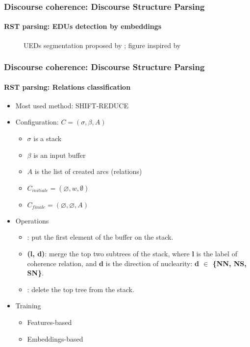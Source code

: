 \documentclass[xcolor=table]{beamer}
\begin{document}
\begin{frame}
	\frametitle{Discourse coherence: Discourse Structure Parsing}
	\framesubtitle{RST parsing: EDUs detection by embeddings}
	
	\begin{figure}
		\centering
		\caption{UEDs segmentation proposed by \cite{2018-wang-al}; figure inspired by \cite{2019-jurafsky-martin}}
	\end{figure}
	
\end{frame}

\begin{frame}
	\frametitle{Discourse coherence: Discourse Structure Parsing}
	\framesubtitle{RST parsing: Relations classification}
	
	\begin{minipage}{.6\textwidth}
	\begin{itemize}
		\item Most used method: SHIFT-REDUCE
		\item Configuration: $C = (\sigma, \beta, A)$
		\begin{itemize}
			\item $\sigma$ is a stack
			\item $\beta$ is an input buffer
			\item $A$ is the list of created arcs (relations)
			\item $C_{initiale} = (\varnothing, w, \emptyset)$
			\item $C_{finale} = (\varnothing, \varnothing, A)$
		\end{itemize}
	\end{itemize}
	\end{minipage}
	\begin{minipage}{.38\textwidth}
	\end{minipage}
	\begin{itemize}
		\item Operations 
		\begin{itemize}
			\item {}: put the first element of the buffer on the stack.
			\item {}\textbf{(l, d)}: merge the top two subtrees of the stack, where \textbf{l} is the label of coherence relation, and \textbf{d} is the direction of nuclearity: \textbf{d $ \in $ \{NN, NS, SN\}}.
			\item {}: delete the top tree from the stack.
		\end{itemize}
		\item Training 
		\begin{itemize}
			\item Features-based
			\item Embeddings-based
		\end{itemize}
	\end{itemize}
	
\end{frame}
\end{document}
